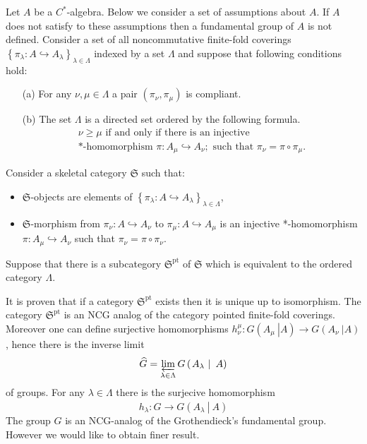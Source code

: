 \documentclass{beamer}
\theoremstyle{plain}
\newcommand{\be}{\begin{equation}}
\newcommand{\ee}{\end{equation}}
\newcommand{\la}{\lambda}
\newcommand{\La}{\Lambda}
\newcommand{\hookto}{\hookrightarrow}        %
\begin{document}
\begin{frame}
Let $A$ be a $C^*$-algebra. Below we consider a set of assumptions about $A$. If $A$ does not satisfy to these assumptions then a fundamental group of $A$ is not defined. Consider a set of all noncommutative  finite-fold coverings $\left\{ \pi_{\la}:A \hookto A_{\la}\right\}_{\la \in \La}$ indexed by a set  $\La$ and suppose that  following conditions hold:
\begin{enumerate}
	\item[(a)] For any $\nu, \mu \in \La$ a pair $\left( \pi_\nu, \pi_\mu\right)$ is compliant.
	\item [(b)]
The set	$\La$ is a directed set ordered by the following formula.
	\be\label{fg_ord_eqn}
	\begin{split}
		\nu \ge \mu  \text{ if and only if there is an injective}\\ \text{*-homomorphism } \pi: A_\mu \hookto A_\nu; 
		\text{ such that } \pi_\nu = \pi \circ \pi_\mu.
	\end{split}
	\ee
\end{enumerate}
Consider a skeletal category $\mathfrak{S}$ such that:
\begin{itemize}
	\item $\mathfrak{S}$-objects are elements of $\left\{ \pi_{\la}:A \hookto A_{\la}\right\}_{\la \in \La}$,
	\item $\mathfrak{S}$-morphism from $ \pi_\nu: A \hookto A_{\nu}$ to $ \pi_\mu: A \hookto A_\mu$ is an injective *-homomorphism $\pi : A_\mu \hookto  A_\nu$ such that $\pi_\nu = \pi \circ \pi_\nu$. 
\end{itemize}
Suppose that there is a subcategory $\mathfrak{S}^{\text{pt}}$ of  $\mathfrak{S}$   which is equivalent to the ordered category $\La$. 
\end{frame}
\begin{frame}
	It is proven that if a category $\mathfrak{S}^{\text{pt}}$ exists then it is unique up to isomorphism. The category $\mathfrak{S}^{\text{pt}}$ is an NCG analog of the category pointed finite-fold coverings. Moreover  one can define surjective homomorphisms  $h^\mu_\nu:  G\left(\left.A_\mu~\right|A \right) \to  G\left(\left.A_\nu~\right|A \right)$, hence there is the inverse limit 
	$$
	\widehat{G}=	\varprojlim_{\la \in \La} G\left(\left.A_\la~\right|~A\right)
	$$
	of groups. For any $\la \in \La$ there is the surjecive homomorphism 
	\be\label{h_la_eqn}
	h_\la:\widehat{G}\to G\left(\left.A_\la~\right|~A\right)
	\ee
	The group $\widehat{G}$ is an NCG-analog of the Grothendieck's fundamental group. However we would like to obtain finer result.
\end{frame}
\end{document}
